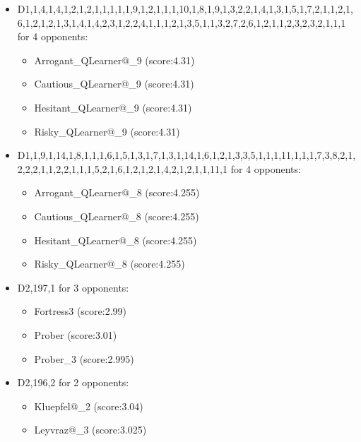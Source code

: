 \begin{appendices}
\begin{itemize}
        \item D1,1,4,1,4,1,2,1,2,1,1,1,1,1,9,1,2,1,1,1,10,1,8,1,9,1,3,2,2,1,4,1,3,1,5,1,7,2,1,1,2,1,6,1,2,1,2,1,3,1,4,1,4,2,3,1,2,2,4,1,1,1,2,1,3,5,1,1,3,2,7,2,6,1,2,1,1,2,3,2,3,2,1,1,1 for 4 opponents:
        \begin{multicols}{3}
            \begin{itemize}
                \item Arrogant\_QLearner@\_9 (score:4.31)
                \item Cautious\_QLearner@\_9 (score:4.31)
                \item Hesitant\_QLearner@\_9 (score:4.31)
                \item Risky\_QLearner@\_9 (score:4.31)
            \end{itemize}
        \end{multicols}

        \item D1,1,9,1,14,1,8,1,1,1,6,1,5,1,3,1,7,1,3,1,14,1,6,1,2,1,3,3,5,1,1,1,11,1,1,1,7,3,8,2,1,2,2,2,1,1,2,2,1,1,1,5,2,1,6,1,2,1,2,1,4,2,1,2,1,1,11,1 for 4 opponents:
        \begin{multicols}{3}
            \begin{itemize}
                \item Arrogant\_QLearner@\_8 (score:4.255)
                \item Cautious\_QLearner@\_8 (score:4.255)
                \item Hesitant\_QLearner@\_8 (score:4.255)
                \item Risky\_QLearner@\_8 (score:4.255)
            \end{itemize}
        \end{multicols}

        \item D2,197,1 for 3 opponents:
        \begin{multicols}{3}
            \begin{itemize}
                \item Fortress3 (score:2.99)
                \item Prober (score:3.01)
                \item Prober\_3 (score:2.995)
            \end{itemize}
        \end{multicols}

        \item D2,196,2 for 2 opponents:
        \begin{multicols}{3}
            \begin{itemize}
                \item Kluepfel@\_2 (score:3.04)
                \item Leyvraz@\_3 (score:3.025)
            \end{itemize}
        \end{multicols}


\end{itemize}
\end{appendices}
